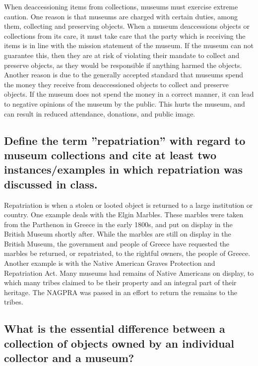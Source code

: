 \documentclass[11pt]{article}
\begin{document}
When deaccessioning items from collections, museums must exercise extreme caution. One reason is that museums are charged with certain duties, among them, collecting and preserving objects. When a museum deaccessions objects or collections from its care, it must take care that the party which is receiving the items is in line with the mission statement of the museum. If the museum can not guarantee this, then they are at risk of violating their mandate to collect and preserve objects, as they would be responsible if anything harmed the objects. Another reason is due to the generally accepted standard that museums spend the money they receive from deaccessioned objects to collect and preserve objects. If the museum does not spend the money in a correct manner, it can lead to negative opinions of the museum by the public. This hurts the museum, and can result in reduced attendance, donations, and public image.

\begin{singlespacing}
\subsection*{Define the term ''repatriation'' with regard to museum collections and cite at least two instances/examples in which repatriation was discussed in class.}
\end{singlespacing}

Repatriation is when a stolen or looted object is returned to a large institution or country. One example deals with the Elgin Marbles. These marbles were taken from the Parthenon in Greece in the early 1800s, and put on display in the British Museum shortly after. While the marbles are still on display in the British Museum, the government and people of Greece have requested the marbles be returned, or repatriated, to the rightful owners, the people of Greece. Another example is with the Native American Graves Protection and Repatriation Act. Many museums had remains of Native Americans on display, to which many tribes claimed to be their property and an integral part of their heritage. The NAGPRA was passed in an effort to return the remains to the tribes.

\begin{singlespacing}
\subsection*{What is the essential difference between a collection of objects owned by an individual collector and a museum?}
\end{singlespacing}
\end{document}
